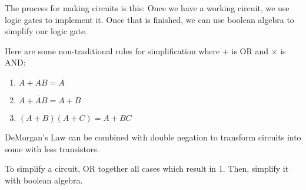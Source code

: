 
The process for making circuits is this: Once we have a working circuit, we use logic gates to implement it. Once that is finished, we can use boolean algebra to simplify our logic gate.

Here are some non-traditional rules for simplification where \( + \) is OR and \( \times  \) is AND:
\begin{enumerate}
	\item \( A + AB = A \)
	\item \( A + \overline{A}B = A + B \)
	\item \( (A + B)(A + C) = A + BC \)
\end{enumerate}

DeMorgan's Law can be combined with double negation to transform circuits into some with less transistors.

To simplify a circuit, OR together all cases which result in 1. Then, simplify it with boolean algebra.
